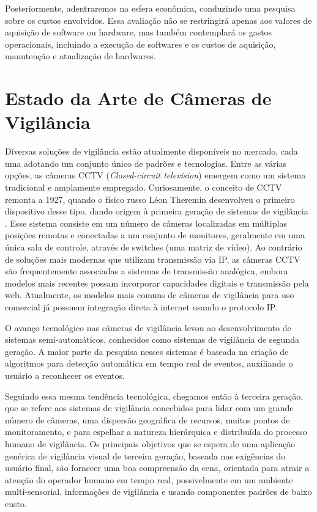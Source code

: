 \documentclass[12pt, %
openright, 
oneside, %
a4paper,    %
brazil]{facom-ufu-abntex2}
\begin{document}
Posteriormente, adentraremos na esfera econômica, conduzindo uma pesquisa sobre
os custos envolvidos. Essa avaliação não se restringirá apenas aos valores de
aquisição de software ou hardware, mas também contemplará os gastos
operacionais, incluindo a execução de softwares e os custos de aquisição,
manutenção e atualização de hardwares.

\section{Estado da Arte de Câmeras de Vigilância}

Diversas soluções de vigilância estão atualmente disponíveis no mercado, cada
uma adotando um conjunto único de padrões e tecnologias. Entre as várias
opções, as câmeras CCTV (\textit{\foreignlanguage{english}{Closed-circuit
		television}}) emergem como um sistema tradicional e amplamente empregado.
Curiosamente, o conceito de CCTV remonta a 1927, quando o físico russo Léon
Theremin desenvolveu o primeiro dispositivo desse tipo, dando origem à primeira
geração de sistemas de vigilância \cite{glinsky2000theremin}. Esse sistema
consiste em um número de câmeras localizadas em múltiplas posições remotas e
conectadas a um conjunto de monitores, geralmente em uma única sala de
controle, através de switches (uma matriz de vídeo). Ao contrário de soluções
mais modernas que utilizam transmissão via IP, as câmeras CCTV são
frequentemente associadas a sistemas de transmissão analógica, embora modelos
mais recentes possam incorporar capacidades digitais e transmissão pela web.
Atualmente, os modelos mais comuns de câmeras de vigilância para uso comercial
já possuem integração direta à internet usando o protocolo IP.

O avanço tecnológico nas câmeras de vigilância levou ao desenvolvimento de
sistemas semi-automáticos, conhecidos como sistemas de vigilância de segunda
geração. A maior parte da pesquisa nesses sistemas é baseada na criação de
algoritmos para detecção automática em tempo real de eventos, auxiliando o
usuário a reconhecer os eventos.

Seguindo essa mesma tendência tecnológica, chegamos então à terceira geração,
que se refere aos sistemas de vigilância concebidos para lidar com um grande
número de câmeras, uma dispersão geográfica de recursos, muitos pontos de
monitoramento, e para espelhar a natureza hierárquica e distribuída do processo
humano de vigilância. Os principais objetivos que se espera de uma aplicação
genérica de vigilância visual de terceira geração, baseada nas exigências do
usuário final, são fornecer uma boa compreensão da cena, orientada para atrair
a atenção do operador humano em tempo real, possivelmente em um ambiente
multi-sensorial, informações de vigilância e usando componentes padrões de
baixo custo.
\end{document}
